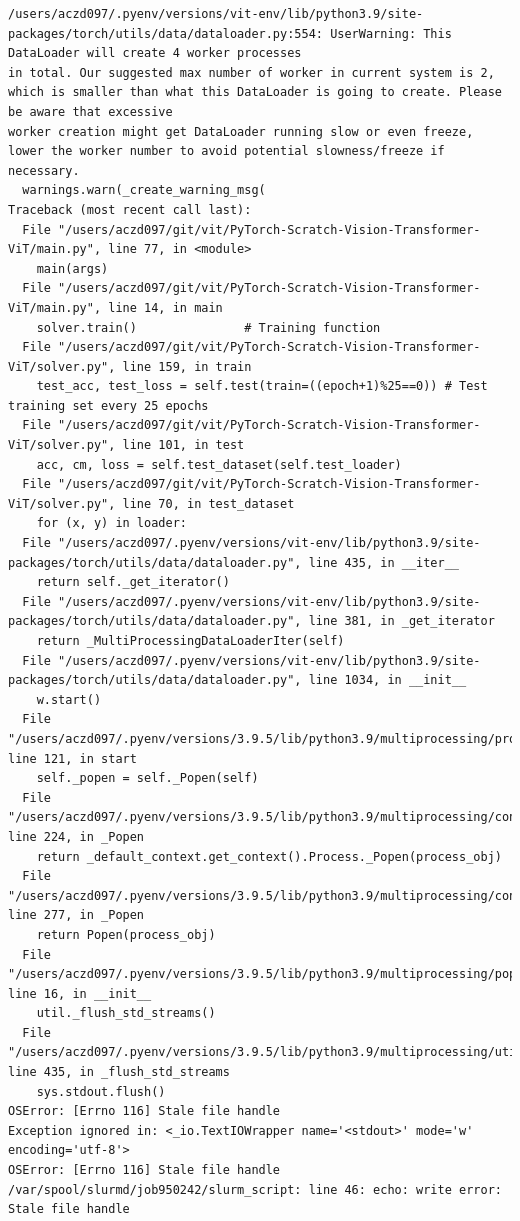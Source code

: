 \begin{verbatim}
/users/aczd097/.pyenv/versions/vit-env/lib/python3.9/site-packages/torch/utils/data/dataloader.py:554: UserWarning: This DataLoader will create 4 worker processes 
in total. Our suggested max number of worker in current system is 2, which is smaller than what this DataLoader is going to create. Please be aware that excessive 
worker creation might get DataLoader running slow or even freeze, lower the worker number to avoid potential slowness/freeze if necessary.
  warnings.warn(_create_warning_msg(
Traceback (most recent call last):
  File "/users/aczd097/git/vit/PyTorch-Scratch-Vision-Transformer-ViT/main.py", line 77, in <module>
    main(args)
  File "/users/aczd097/git/vit/PyTorch-Scratch-Vision-Transformer-ViT/main.py", line 14, in main
    solver.train()               # Training function
  File "/users/aczd097/git/vit/PyTorch-Scratch-Vision-Transformer-ViT/solver.py", line 159, in train
    test_acc, test_loss = self.test(train=((epoch+1)%25==0)) # Test training set every 25 epochs
  File "/users/aczd097/git/vit/PyTorch-Scratch-Vision-Transformer-ViT/solver.py", line 101, in test
    acc, cm, loss = self.test_dataset(self.test_loader)
  File "/users/aczd097/git/vit/PyTorch-Scratch-Vision-Transformer-ViT/solver.py", line 70, in test_dataset
    for (x, y) in loader:
  File "/users/aczd097/.pyenv/versions/vit-env/lib/python3.9/site-packages/torch/utils/data/dataloader.py", line 435, in __iter__
    return self._get_iterator()
  File "/users/aczd097/.pyenv/versions/vit-env/lib/python3.9/site-packages/torch/utils/data/dataloader.py", line 381, in _get_iterator
    return _MultiProcessingDataLoaderIter(self)
  File "/users/aczd097/.pyenv/versions/vit-env/lib/python3.9/site-packages/torch/utils/data/dataloader.py", line 1034, in __init__
    w.start()
  File "/users/aczd097/.pyenv/versions/3.9.5/lib/python3.9/multiprocessing/process.py", line 121, in start
    self._popen = self._Popen(self)
  File "/users/aczd097/.pyenv/versions/3.9.5/lib/python3.9/multiprocessing/context.py", line 224, in _Popen
    return _default_context.get_context().Process._Popen(process_obj)
  File "/users/aczd097/.pyenv/versions/3.9.5/lib/python3.9/multiprocessing/context.py", line 277, in _Popen
    return Popen(process_obj)
  File "/users/aczd097/.pyenv/versions/3.9.5/lib/python3.9/multiprocessing/popen_fork.py", line 16, in __init__
    util._flush_std_streams()
  File "/users/aczd097/.pyenv/versions/3.9.5/lib/python3.9/multiprocessing/util.py", line 435, in _flush_std_streams
    sys.stdout.flush()
OSError: [Errno 116] Stale file handle
Exception ignored in: <_io.TextIOWrapper name='<stdout>' mode='w' encoding='utf-8'>
OSError: [Errno 116] Stale file handle
/var/spool/slurmd/job950242/slurm_script: line 46: echo: write error: Stale file handle


\end{verbatim}

